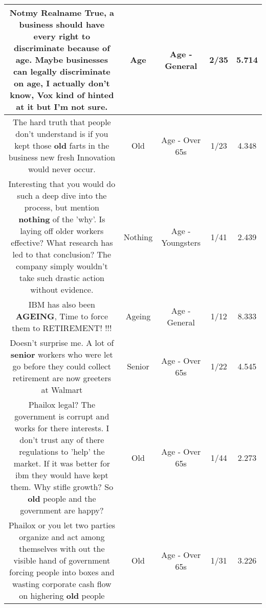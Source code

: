 \documentclass[11pt]{article}
\newlength\mylength
\begin{document}
\begin{center}
\begin{longtable}{|C{.65\mylength}|C{.30\mylength}|C{.12\mylength}|C{.12\mylength}|C{.12\mylength}|}
  \small Notmy Realname True, a business should have every right to discriminate because of \textbf{age}. Maybe businesses can legally discriminate on \textbf{age}, I actually don't know, Vox kind of hinted at it but I'm not sure.\normalsize   & Age & Age - General & 2/35 & 5.714 \\  \hline
  \small The hard truth that people don't understand is if you kept those \textbf{old} farts in the business new fresh Innovation would never occur.\normalsize   & Old & Age - Over 65s & 1/23 & 4.348 \\  \hline
  \small Interesting that you would do such a deep dive into the process, but mention \textbf{nothing} of the 'why'. Is laying off older workers effective? What research has led to that conclusion? The company simply wouldn't take such drastic action without evidence.\normalsize   & Nothing & Age - Youngsters & 1/41 & 2.439 \\  \hline
  \small IBM has also been \textbf{AGEING}, Time to force them to RETIREMENT! !!!\normalsize   & Ageing & Age - General & 1/12 & 8.333 \\  \hline
  \small Doesn't surprise me. A lot of \textbf{senior} workers who were let go before they could collect retirement are now greeters at Walmart\normalsize   & Senior & Age - Over 65s & 1/22 & 4.545 \\  \hline
  \small Phailox legal? The government is corrupt and works for there interests. I don't trust any of there regulations to 'help' the market. If it was better for ibm they would have kept them. Why stifle growth? So \textbf{old} people and the government are happy?\normalsize   & Old & Age - Over 65s & 1/44 & 2.273 \\  \hline
  \small Phailox or you let two parties organize and act among themselves with out the visible hand of government forcing people into boxes and wasting corporate cash flow on highering \textbf{old} people\normalsize   & Old & Age - Over 65s & 1/31 & 3.226 \\  \hline

\end{longtable}
\end{center}
\end{document}
